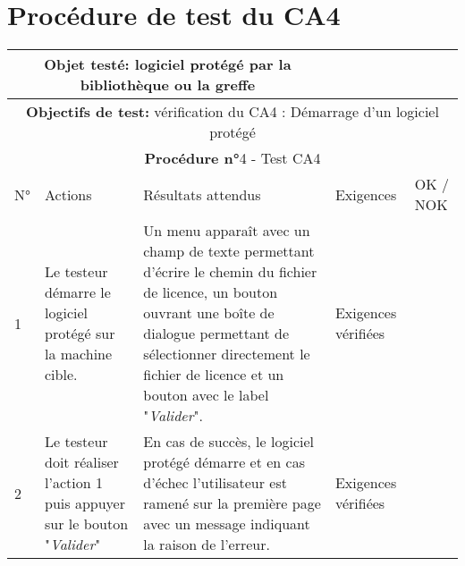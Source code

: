 \section{Procédure de test du CA4}
\begin{table}[!h]
        \centering
        \begin{tabular}{|m{0.6cm}|
                         >{\raggedright\arraybackslash}m{4cm}|
                         >{\raggedright\arraybackslash}m{6.4cm}|
                         >{\raggedright\arraybackslash}m{2cm}|
                         m{1cm}|}
            \hline
            \multicolumn{3}{|c|}{
                \textbf{Objet testé: } logiciel protégé par la bibliothèque ou la greffe
            } & \multicolumn{2}{|c|}{
                \textbf{Version: } version    
            } \\
            \hline
            \multicolumn{5}{|c|}{\textbf{Objectifs de test:}
                vérification du CA4 : Démarrage d'un logiciel protégé} \\
            \hline
            \multicolumn{5}{|c|}{
                \textbf{Procédure n°}4 - Test CA4 
            } \\
            \hline
            N° & Actions & Résultats attendus & Exigences & OK / NOK \\
            \hline      %
            1 & Le testeur démarre le logiciel protégé sur la machine
                cible. 
              & Un menu apparaît avec un champ de texte permettant d'écrire
                le chemin du fichier de licence, un bouton ouvrant une 
                boîte de dialogue permettant de sélectionner directement 
                le fichier de licence et un bouton avec le label "\emph{Valider}". 
              & Exigences vérifiées & \\
            \hline
            2 & Le testeur doit réaliser l'action 1 puis appuyer sur le bouton
                "\emph{Valider}"
              & En cas de succès, le logiciel protégé démarre et en cas d'échec
                l'utilisateur est ramené sur la première page avec un message 
                indiquant la raison de l'erreur. 
              & Exigences vérifiées & \\
            \hline
        \end{tabular} 
        \label{tab:tab4}
\end{table}
\newpage

